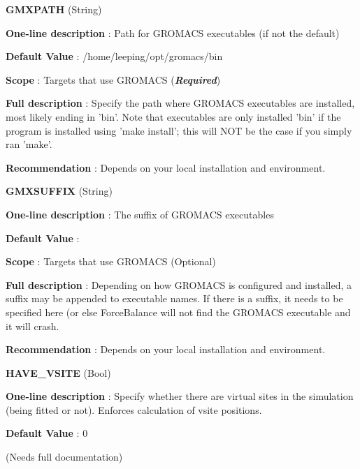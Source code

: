 \begin{DoxyItemize}
\item {\bfseries  G\-M\-X\-P\-A\-T\-H } (String) \par
{\bfseries  One-\/line description }\-: Path for G\-R\-O\-M\-A\-C\-S executables (if not the default) \par
{\bfseries  Default Value }\-: /home/leeping/opt/gromacs/bin \par
{\bfseries  Scope }\-: Targets that use G\-R\-O\-M\-A\-C\-S ({\bfseries {\itshape Required}}) \par
{\bfseries  Full description }\-: Specify the path where G\-R\-O\-M\-A\-C\-S executables are installed, most likely ending in 'bin'. Note that executables are only installed 'bin' if the program is installed using 'make install'; this will N\-O\-T be the case if you simply ran 'make'. \par
{\bfseries  Recommendation }\-: Depends on your local installation and environment.\end{DoxyItemize}
\begin{DoxyItemize}
\item {\bfseries  G\-M\-X\-S\-U\-F\-F\-I\-X } (String) \par
{\bfseries  One-\/line description }\-: The suffix of G\-R\-O\-M\-A\-C\-S executables \par
{\bfseries  Default Value }\-: \par
{\bfseries  Scope }\-: Targets that use G\-R\-O\-M\-A\-C\-S (Optional) \par
{\bfseries  Full description }\-: Depending on how G\-R\-O\-M\-A\-C\-S is configured and installed, a suffix may be appended to executable names. If there is a suffix, it needs to be specified here (or else Force\-Balance will not find the G\-R\-O\-M\-A\-C\-S executable and it will crash. \par
{\bfseries  Recommendation }\-: Depends on your local installation and environment.\end{DoxyItemize}
\begin{DoxyItemize}
\item {\bfseries  H\-A\-V\-E\-\_\-\-V\-S\-I\-T\-E } (Bool) \par
{\bfseries  One-\/line description }\-: Specify whether there are virtual sites in the simulation (being fitted or not). Enforces calculation of vsite positions. \par
{\bfseries  Default Value }\-: 0 \par
(Needs full documentation)\end{DoxyItemize}
